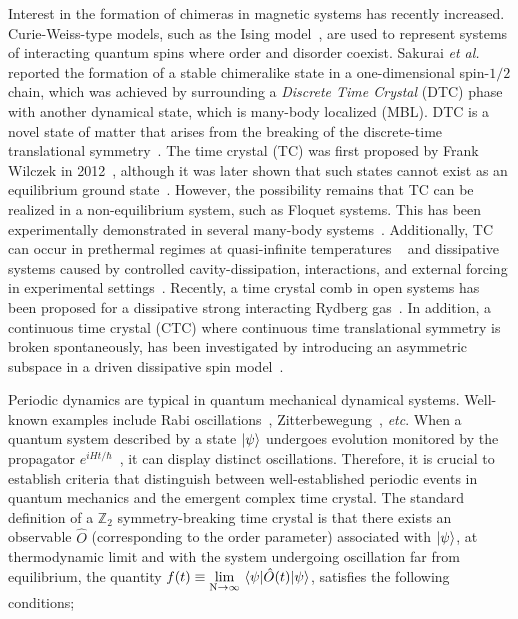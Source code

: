 \documentclass[12pt]{iopart}
\begin{document}
Interest in the formation of chimeras in magnetic systems has recently increased. Curie-Weiss-type models, such as the Ising model~\cite{singh_chimera_2011}, are used to represent systems of interacting quantum spins where order and disorder coexist. Sakurai \textit{et al.}~\cite{sakurai_phys_nodate} reported the formation of a stable chimeralike state in a one-dimensional spin-$1/2$ chain, which was achieved by surrounding a \textit{Discrete Time Crystal} (DTC) phase with another dynamical state, which is many-body localized (MBL). DTC is a novel state of matter that arises from the breaking of the discrete-time translational symmetry~\cite{else_floquet_2016}. The time crystal (TC) was first proposed by Frank Wilczek in 2012~\cite{wilczek_quantum_2012}, although it was later shown that such states cannot exist as an equilibrium ground state~\cite{Bruno_comment_1, Bruno2013, watanabe_absence_2015}. However, the possibility remains that TC can be realized in a non-equilibrium system, such as Floquet systems. This has been experimentally demonstrated in several many-body systems~\cite{huang2018,taheri_all-optical_2022, Soham2018, zhang_observation_2017, yao_time_2018,frey_realization_2022, rovny_observation_2018, sacha_time_nodate,golletz_basis_2022}.  Additionally, TC can occur in prethermal regimes at quasi-infinite temperatures ~\cite{Stasiuk2023} and dissipative systems caused by controlled cavity-dissipation, interactions, and external forcing in experimental settings~\cite{Hans2021}. Recently, a time crystal comb in open systems has been proposed for a dissipative strong interacting Rydberg gas~\cite{jiao2024}. In addition, a continuous time crystal (CTC) where continuous time translational symmetry is broken spontaneously,  has been investigated by introducing an asymmetric subspace in a driven dissipative spin model~\cite{solanki2024}.

Periodic dynamics are typical in quantum mechanical dynamical systems. Well-known examples include Rabi oscillations~\cite{Sakurai_Napolitano_2020}, Zitterbewegung~\cite{LeBlanc_2013}, \textit{etc}. When a quantum system described by a state $\ket{\psi}$ undergoes evolution monitored by the propagator $e^{i H t / \hbar}$~\cite{Biao2018,russomanno_floquet_2017}, it can display distinct oscillations. Therefore, it is crucial to establish criteria that distinguish between well-established periodic events in quantum mechanics and the emergent complex time crystal. The standard definition of a $\mathbb{Z}_2$ symmetry-breaking time crystal is that there exists an observable $\hat{O}$ (corresponding to the order parameter) associated with $\ket{\psi}$, at thermodynamic limit and with the system undergoing oscillation far from equilibrium, the quantity
$\displaystyle f(t) \equiv \lim_{\mathrm{N}\to\infty}\expval{\hat{O}(t)}{\psi}$,
satisfies the following conditions;
\end{document}

